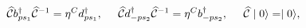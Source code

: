 \begin{equation}
\widehat{\mathcal{C}}b_{ps_{1}}^{\dagger }\widehat{\mathcal{C}}^{-1}=\eta
^{C}d_{ps_{1}}^{\dagger },\;\;\;\;\;\widehat{\mathcal{C}}d_{-ps_{2}}^{%
\dagger }\widehat{\mathcal{C}}^{-1}=\eta ^{C}b_{-ps_{2}}^{\dagger
},\;\;\;\;\;\widehat{\mathcal{C}}\mid 0\rangle =\mid 0\rangle ,
\end{equation}

